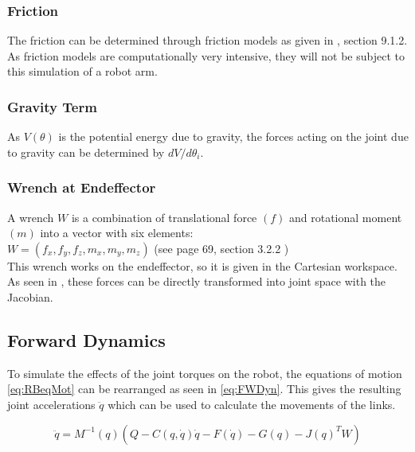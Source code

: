 \subsubsection{Friction}
The friction can be determined through friction models as given in  \cite{CorkeRoboticVisionControl}, section 9.1.2.
As friction models are computationally very intensive, they will not be subject to this simulation of a robot arm.

\subsubsection{Gravity Term}
As  $V (\theta)$ is the potential energy due to gravity, the forces acting on the joint due to gravity can be determined by $dV/d\theta_i$. %

\subsubsection{Wrench at Endeffector}
A wrench $W$ is a combination of translational force $(f)$ and rotational moment $(m)$ into a vector with six elements:\\
$ W = (f_x, f_y, f_z, m_x, m_y, m_z)$ (see \cite{CorkeRoboticVisionControl} page 69, section 3.2.2 )\\
This wrench works on the \gls{endeffector}, so it is given in the Cartesian workspace.
As seen in , these forces can be directly transformed into joint space with the Jacobian.









\subsection{Forward Dynamics}
To simulate the effects of the joint torques on the robot, the equations of motion  \ref{eq:RBeqMot} can be rearranged as seen in \ref{eq:FWDyn}. This gives the resulting joint accelerations $\ddot{q}$ which can be used to calculate the movements of the links.

\begin{equation} \label{eq:FWDyn}
	\ddot{q}= M^{-1}(q) (Q-C(q,\dot{q})\dot{q} - F(\dot{q}) -G(q) -J(q)^T W)
\end{equation}

